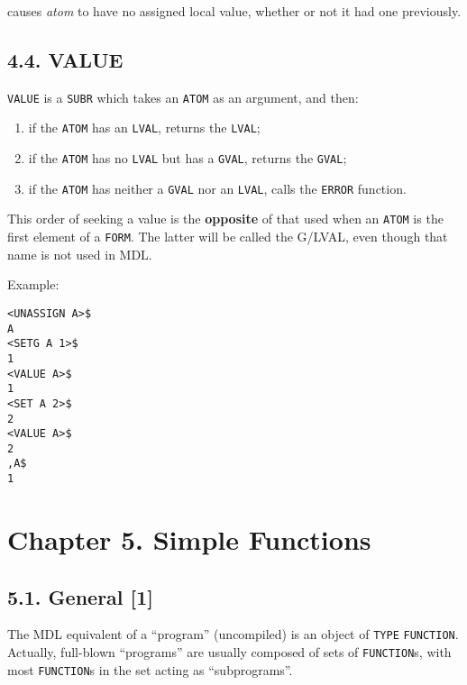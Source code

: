 \documentclass[a4paper,]{article}
\providecommand{\tightlist}{%
  \setlength{\itemsep}{0pt}\setlength{\parskip}{0pt}}
\begin{document}
 causes \emph{atom} to have no assigned local value, whether or not it had one previously.

\subsection{4.4. VALUE}\label{value}

\texttt{VALUE} is a \texttt{SUBR} which takes an \texttt{ATOM} as an argument, and then:

\begin{enumerate}
\def\labelenumi{\arabic{enumi}.}
\tightlist
\item
  if the \texttt{ATOM} has an \texttt{LVAL}, returns the \texttt{LVAL};
\item
  if the \texttt{ATOM} has no \texttt{LVAL} but has a \texttt{GVAL}, returns the \texttt{GVAL};
\item
  if the \texttt{ATOM} has neither a \texttt{GVAL} nor an \texttt{LVAL}, calls the \texttt{ERROR} function.
\end{enumerate}

This order of seeking a value is the \textbf{opposite} of that used when an \texttt{ATOM} is the first element of a
\texttt{FORM}. The latter will be called the G/LVAL, even though that name is not used in MDL.

Example:

\begin{verbatim}
<UNASSIGN A>$
A
<SETG A 1>$
1
<VALUE A>$
1
<SET A 2>$
2
<VALUE A>$
2
,A$
1
\end{verbatim}

\section{Chapter 5. Simple Functions}\label{chapter-5.-simple-functions}

\subsection{5.1. General {[}1{]}}\label{general-1-2}

The MDL equivalent of a ``program'' (uncompiled) is an object of \texttt{TYPE}
\texttt{FUNCTION}. Actually, full-blown ``programs'' are usually composed of sets of
\texttt{FUNCTION}s, with most \texttt{FUNCTION}s in the set acting as ``subprograms''.
\end{document}
